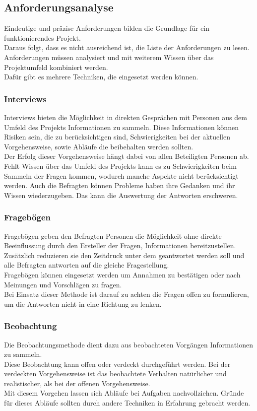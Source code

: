 \documentclass[12pt,a4paper]{article}
\begin{document}
\subsection{Anforderungsanalyse}
Eindeutige und präzise Anforderungen bilden die Grundlage für ein funktionierendes Projekt\cite{doi:10.1080/12460125.2016.1187390}. \\
Daraus folgt, dass es nicht ausreichend ist, die Liste der Anforderungen zu lesen. Anforderungen müssen analysiert und mit weiterem Wissen über das Projektumfeld kombiniert werden. \\
Dafür gibt es mehrere Techniken, die eingesetzt werden können. 
\subsubsection{Interviews}
\label{interview}
Interviews bieten die Möglichkeit in direkten Gesprächen mit Personen aus dem Umfeld des Projekts Informationen zu sammeln. Diese Informationen können Risiken sein, die zu berücksichtigen sind, Schwierigkeiten bei der aktuellen Vorgehensweise, sowie Abläufe die beibehalten werden sollten. \\
Der Erfolg dieser Vorgehensweise hängt dabei von allen Beteiligten Personen ab. Fehlt Wissen über das Umfeld des Projekts kann es zu Schwierigkeiten beim Sammeln der Fragen kommen, wodurch manche Aspekte nicht berücksichtigt werden. Auch die Befragten können Probleme haben ihre Gedanken und ihr Wissen wiederzugeben\cite{tiwari2012selecting}. Das kann die Auswertung der Antworten erschweren.
\subsubsection{Fragebögen}
\label{Fragebögen}
Fragebögen geben den Befragten Personen die Möglichkeit ohne direkte Beeinflussung durch den Ersteller der Fragen, Informationen bereitzustellen. Zusätzlich reduzieren sie den Zeitdruck unter dem geantwortet werden soll und alle Befragten antworten auf die gleiche Fragestellung.\\
Fragebögen können eingesetzt werden um Annahmen zu bestätigen oder nach Meinungen und Vorschlägen zu fragen\cite{tiwari2012selecting}. \\
Bei Einsatz dieser Methode ist darauf zu achten die Fragen offen zu formulieren, um die Antworten nicht in eine Richtung zu lenken. 
\subsubsection{Beobachtung}
\label{Beobachtung}
Die Beobachtungsmethode dient dazu aus beobachteten Vorgängen Informationen zu sammeln. \\
Diese Beobachtung kann offen oder verdeckt durchgeführt werden. Bei der verdeckten Vorgehensweise ist das beobachtete Verhalten natürlicher und realistischer, als bei der offenen Vorgehensweise\cite{silhavy2011requirements}. \\
Mit diesem Vorgehen lassen sich Abläufe bei Aufgaben nachvollziehen. Gründe für dieses Abläufe sollten durch andere Techniken in Erfahrung gebracht werden.\\
\end{document}
